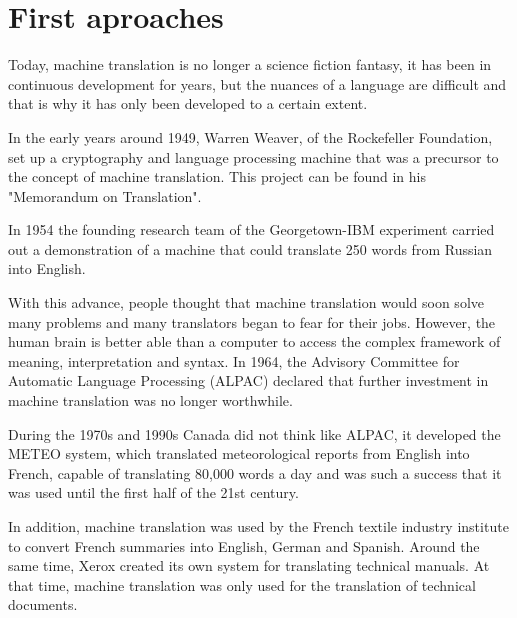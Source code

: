 \documentclass[a4paper]{article}
\theoremstyle{plain}
\theoremstyle{definition}
\begin{document}
	\section{First aproaches}
	\label{sec:examples}
	\begin{flushleft}
	Today, machine translation is no longer a science fiction fantasy, it has been in continuous development for years, but the nuances of a language are difficult and that is why it has only been developed to a certain extent.\par
	
	In the early years around 1949, Warren Weaver, of the Rockefeller Foundation, set up a cryptography and language processing machine that was a precursor to the concept of machine translation. This project can be found in his "Memorandum on Translation".\par

    In 1954 the founding research team of the Georgetown-IBM experiment carried out a demonstration of a machine that could translate 250 words from Russian into English.\par
    
    With this advance, people thought that machine translation would soon solve many problems and many translators began to fear for their jobs. However, the human brain is better able than a computer to access the complex framework of meaning, interpretation and syntax. In 1964, the Advisory Committee for Automatic Language Processing (ALPAC) declared that further investment in machine translation was no longer worthwhile.\par

    During the 1970s and 1990s Canada did not think like ALPAC, it developed the METEO system, which translated meteorological reports from English into French, capable of translating 80,000 words a day and was such a success that it was used until the first half of the 21st century.\par\par\par
    
    In addition, machine translation was used by the French textile industry institute to convert French summaries into English, German and Spanish. Around the same time, Xerox created its own system for translating technical manuals. At that time, machine translation was only used for the translation of technical documents.\par\par


\end{flushleft}
\end{document}
